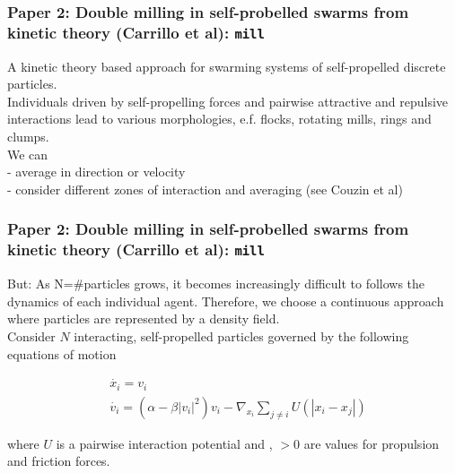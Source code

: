\documentclass[compress]{beamer}
\begin{document}
\begin{frame}
  \frametitle{Paper 2: Double milling in self-probelled swarms from kinetic theory (Carrillo et al): \texttt{mill}}
\small A kinetic theory based approach for swarming systems of self-propelled discrete particles. \\


  Individuals driven by self-propelling forces and pairwise attractive and repulsive interactions lead to various morphologies, e.f. flocks, rotating mills, rings and clumps. \\
  We can \\
  - average in direction or velocity \\
  - consider different zones of interaction and averaging (see Couzin et al)
  

%
%
%


\end{frame}

\begin{frame}
	\frametitle{Paper 2: Double milling in self-probelled swarms from kinetic theory (Carrillo et al): \texttt{mill}}
	
	  
	  But: As N=#particles grows, it becomes increasingly difficult to follows the dynamics of each individual agent. Therefore, we choose a continuous approach where particles are represented by a density field. \\
	  
	Consider \( N \) interacting, self-propelled particles governed by the following equations of motion
	
	
	\begin{equation} \label{eqOfMotion}
	\begin{split}
    & \dot{x_{i}} = v_{i} \\
	& \dot{v_{i}} = (\alpha - \beta |v_{i}|^{2}) v_{i} - \nabla_{x_{i}} \sum_{j \neq i}^{} U(|x_{i} - x_{j}|)
	\end{split}
	\end{equation}
	
	where \( U \) is a pairwise interaction potential and \alpha, \beta \(> 0\) are values for propulsion and friction forces.\\

	

\end{frame}
\end{document}
